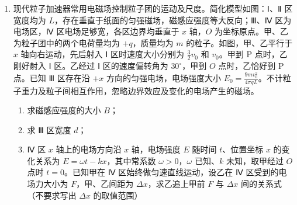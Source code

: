 \documentclass[\gkver]{gaokaozhenti}
\begin{document}
\begin{enumerate}
{（3）弹簧的弹性势能转化为 AB 物块的动能及这个过程中克服摩擦力所做的功，即

$\Delta E_{p} = \frac{1}{2}m_{A}v_{A}^{2} + \frac{1}{2}m_{B}v_{B}^{2} + \mu m_{A}g\Delta x_{A} + \mu m_{B}g\Delta x_{B}$

其中 $m_{A} = m_{B}$，$\Delta x = \Delta x_{A} + \Delta x_{B}$

解得整个过程中，弹簧释放的弹性势能

$\Delta E_{p} = 0.12 \UJ$
}

\item
现代粒子加速器常用电磁场控制粒子团的运动及尺度。简化模型如图：Ⅰ、Ⅱ 区宽度均为 $L$，存在垂直于纸面的匀强磁场，磁感应强度等大反向；Ⅲ、Ⅳ 区为电场区，Ⅳ 区电场足够宽，各区边界均垂直于 $x$ 轴，$O$ 为坐标原点。甲、乙为粒子团中的两个电荷量均为 $+q$，质量均为 $m$ 的粒子。如图，甲、乙平行于 $x$ 轴向右运动，先后射入 Ⅰ 区时速度大小分别为 $\frac{3}{2}v_{0}$ 和 $v_{0}$。甲到 P 点时，乙刚好射入 Ⅰ 区。乙经过 Ⅰ 区的速度偏转角为 $30^\circ$，甲到 $O$ 点时，乙恰好到 P 点。已知 Ⅲ 区存在沿 $+x$ 方向的匀强电场，电场强度大小 $E_{0} = \frac{9mv_{0}^{2}}{4\pi qL}$。不计粒子重力及粒子间相互作用，忽略边界效应及变化的电场产生的磁场。
\begin{enumerate}
	\item
	求磁感应强度的大小 $B$；
	\item
	求 Ⅲ 区宽度 $d$；
	\item
	Ⅳ 区 $x$ 轴上的电场方向沿 $x$ 轴，电场强度 $E$ 随时间 $t$、位置坐标 $x$ 的变化关系为 $E = \omega t - kx$，其中常系数 $\omega > 0$，$\omega$ 已知、$k$ 未知，取甲经过 $O$ 点时 $t = 0$。已知甲在 Ⅳ 区始终做匀速直线运动，设乙在 Ⅳ 区受到的电场力大小为 $F$，甲、乙间距为 $\Delta x$，求乙追上甲前 $F$ 与 $\Delta x$ 间的关系式（不要求写出 $\Delta x$ 的取值范围）
\end{enumerate}
\end{enumerate}
\end{document}
